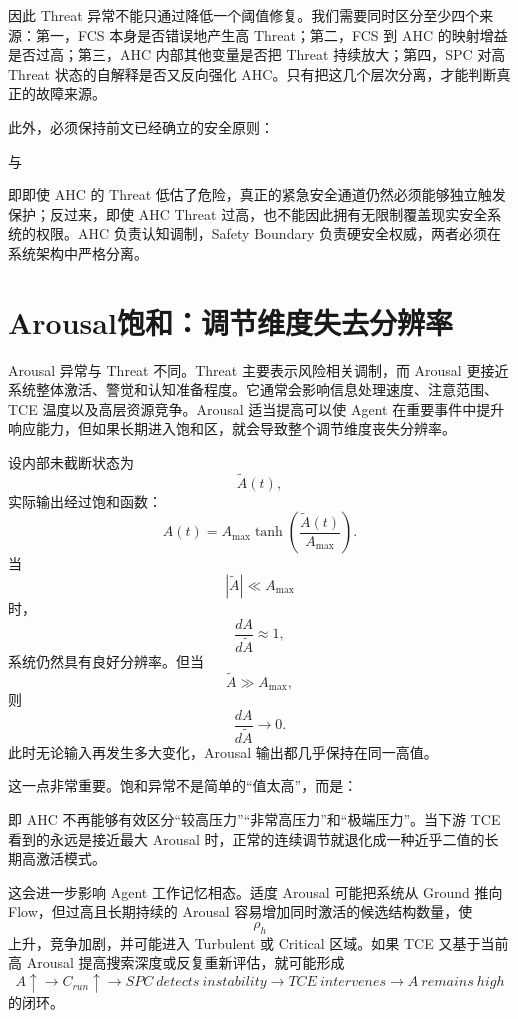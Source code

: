 因此 Threat 异常不能只通过降低一个阈值修复。我们需要同时区分至少四个来源：第一，FCS 本身是否错误地产生高 Threat；第二，FCS 到 AHC 的映射增益是否过高；第三，AHC 内部其他变量是否把 Threat 持续放大；第四，SPC 对高 Threat 状态的自解释是否又反向强化 AHC。只有把这几个层次分离，才能判断真正的故障来源。

此外，必须保持前文已经确立的安全原则：
\begin{statementbox}
\centering
{}
\end{statementbox}
与
\begin{statementbox}
\centering
{}
\end{statementbox}
即即使 AHC 的 Threat 低估了危险，真正的紧急安全通道仍然必须能够独立触发保护；反过来，即使 AHC Threat 过高，也不能因此拥有无限制覆盖现实安全系统的权限。AHC 负责认知调制，Safety Boundary 负责硬安全权威，两者必须在系统架构中严格分离。

\section{Arousal饱和：调节维度失去分辨率}
\label{sec:ahc_arousal_saturation}

Arousal 异常与 Threat 不同。Threat 主要表示风险相关调制，而 Arousal 更接近系统整体激活、警觉和认知准备程度。它通常会影响信息处理速度、注意范围、TCE 温度以及高层资源竞争。Arousal 适当提高可以使 Agent 在重要事件中提升响应能力，但如果长期进入饱和区，就会导致整个调节维度丧失分辨率。

设内部未截断状态为
\[
\tilde A(t),
\]
实际输出经过饱和函数：
\[
A(t)
=
A_{\max}
\tanh
\left(
\frac{\tilde A(t)}{A_{\max}}
\right).
\]
当
\[
|\tilde A|
\ll A_{\max}
\]
时，
\[
\frac{dA}{d\tilde A}\approx1,
\]
系统仍然具有良好分辨率。但当
\[
\tilde A\gg A_{\max},
\]
则
\[
\frac{dA}{d\tilde A}\rightarrow0.
\]
此时无论输入再发生多大变化，Arousal 输出都几乎保持在同一高值。

这一点非常重要。饱和异常不是简单的“值太高”，而是：
\begin{statementbox}
\centering
{}
\end{statementbox}
即 AHC 不再能够有效区分“较高压力”“非常高压力”和“极端压力”。当下游 TCE 看到的永远是接近最大 Arousal 时，正常的连续调节就退化成一种近乎二值的长期高激活模式。

这会进一步影响 Agent 工作记忆相态。适度 Arousal 可能把系统从 Ground 推向 Flow，但过高且长期持续的 Arousal 容易增加同时激活的候选结构数量，使
\[
\rho_h
\]
上升，竞争加剧，并可能进入 Turbulent 或 Critical 区域。如果 TCE 又基于当前高 Arousal 提高搜索深度或反复重新评估，就可能形成
\[
A\uparrow
\rightarrow
C_{run}\uparrow
\rightarrow
SPC\ detects\ instability
\rightarrow
TCE\ intervenes
\rightarrow
A\ remains\ high
\]
的闭环。

